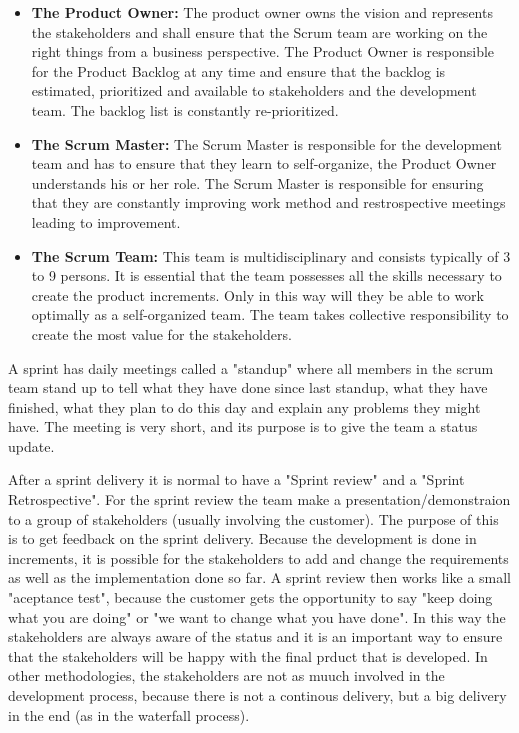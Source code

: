 \begin{itemize}
    \item {\bf The Product Owner: }The product owner owns the vision and represents the stakeholders
    and shall ensure that the Scrum team are working on the right things from a 
    business perspective. The Product Owner is responsible for the Product Backlog 
    at any time and ensure that the backlog is estimated, prioritized and available to 
    stakeholders and the development team. The backlog list is constantly re-prioritized. 
    \item {\bf The Scrum Master: }The Scrum Master is responsible for the development team and has 
    to ensure that they learn to self-organize, the Product Owner understands his or her role.
    The Scrum Master is responsible for ensuring that they are constantly improving work method 
    and restrospective meetings leading to improvement.
    \item {\bf The Scrum Team: }This team is multidisciplinary and consists typically of 3 to 9 persons.
    It is essential that the team possesses all the skills necessary to create the product increments. 
    Only in this way will they be able to work optimally as a self-organized team. The team takes 
    collective responsibility to create the most value for the stakeholders.
\end{itemize}

A sprint has daily meetings called a "standup" where all members in the scrum team stand up
to tell what they have done since last standup, what they have finished, what they plan to do this day and
explain any problems they might have. The meeting is very short, and its purpose is to give the team a status
update.

After a sprint delivery it is normal to have a "Sprint review" and a "Sprint Retrospective".
For the sprint review the team make a presentation/demonstraion to a group of stakeholders (usually involving the
customer). The purpose of this is to get feedback on the sprint delivery. Because the development
is done in increments, it is possible for the stakeholders to add and change the requirements as well as the implementation done so far. A sprint review then works like a small "aceptance test", because the customer gets the opportunity to say "keep doing what you are doing" or "we want to change what you have done". In this way the stakeholders are always aware of the status and it is an important
way to ensure that the stakeholders will be happy with the final prduct that is developed. 
In other methodologies, the stakeholders are not as muuch involved in the development process, because there is not a 
continous delivery, but a big delivery in the end (as in the waterfall process).

